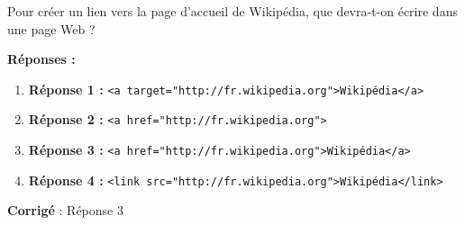 \documentclass[11pt]{article}
\begin{document}
Pour créer un lien vers la page d'accueil de Wikipédia, que devra-t-on
écrire dans une page Web ?

\textbf{Réponses :}

\begin{enumerate}
\def\labelenumi{\arabic{enumi}.}
\item
  \textbf{Réponse 1 :}
  \texttt{\textless{}a\ target="http://fr.wikipedia.org"\textgreater{}Wikipédia\textless{}/a\textgreater{}}
\item
  \textbf{Réponse 2 :}
  \texttt{\textless{}a\ href="http://fr.wikipedia.org"\textgreater{}}
\item
  \textbf{Réponse 3 :}
  \texttt{\textless{}a\ href="http://fr.wikipedia.org"\textgreater{}Wikipédia\textless{}/a\textgreater{}}
\item
  \textbf{Réponse 4 :}
  \texttt{\textless{}link\ src="http://fr.wikipedia.org"\textgreater{}Wikipédia\textless{}/link\textgreater{}}
\end{enumerate}

    \textbf{Corrigé} : Réponse 3


    
    
    
    
\end{document}
